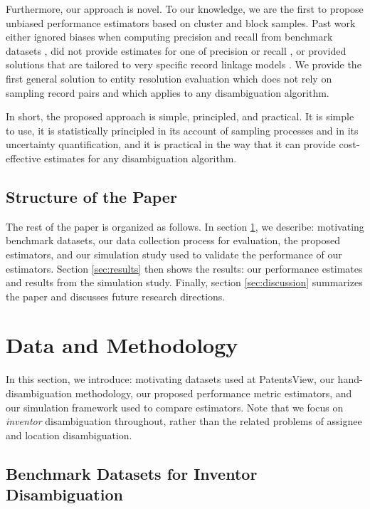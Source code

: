 \documentclass[fontsize=11pt]{article}
\theoremstyle{definition}
\begin{document}
{Furthermore, our approach is novel. To our knowledge, we are the first to propose unbiased performance estimators based on cluster and block samples. Past work either ignored biases when computing precision and recall from benchmark datasets \citep{frisoli2018exploring, Monath2021, han2019disambiguating}, did not provide estimates for one of precision or recall \citep{mcveigh2019scaling}, or provided solutions that are tailored to very specific record linkage models \citep{Belin1995}. We provide the first general solution to entity resolution evaluation which does not rely on sampling record pairs and which applies to any disambiguation algorithm.}


In short, the proposed approach is simple, principled, and practical. It is simple to use, it is statistically principled in its account of sampling processes and in its uncertainty quantification, and it is practical in the way that it can provide cost-effective estimates for any disambiguation algorithm.

\subsection{Structure of the Paper}

The rest of the paper is organized as follows. In section \ref{sec:data_methods}, {we describe: motivating benchmark datasets, our data collection process for evaluation, the proposed estimators, and our simulation study used to validate the performance of our estimators.} Section \ref{sec:results} then shows the results: our performance estimates and results from the simulation study. Finally, section \ref{sec:discussion} summarizes the paper and discusses future research directions.

\section{Data and Methodology}\label{sec:data_methods}

In this section, {we introduce: motivating datasets used at PatentsView, our hand-disambiguation methodology, our proposed performance metric estimators, and our simulation framework used to compare estimators.} {Note that we focus on \textit{inventor} disambiguation throughout, rather than the related problems of assignee and location disambiguation.}

\subsection{Benchmark Datasets for Inventor Disambiguation}
\end{document}
